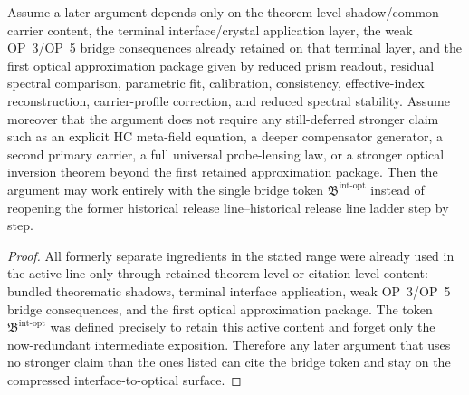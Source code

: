 \begin{proposition}
\label{prop:first-bundled-theorem-level-shadow-package}
\label{prop:first-v320-crystal-shadow-compatibility-principle}
\label{prop:terminal-citation-rule-for-the-present-v320-working-interface}
\label{prop:first-interface-level-defect-face-vanishing-principle}
\label{prop:first-interface-level-fluid-readout-demotion-principle}
\label{prop:first-interface-level-common-carrier-projection-principle}
\label{prop:first-interface-level-probe-coupling-principle}
\label{prop:first-bundled-interface-application-package}
\label{prop:first-op3-op5-bridge-test-on-the-terminal-interface}
\label{prop:first-parametric-spectral-fit-principle}
\label{prop:first-three-parameter-spectral-calibration-principle}
\label{prop:first-overdetermined-spectral-consistency-principle}
\label{prop:first-effective-index-reconstruction-principle-from-prism-data}
\label{prop:first-carrier-profile-correction-principle}
\label{prop:first-reduced-spectral-stability-principle}
\label{prop:first-bundled-optical-approximation-package}
Assume a later argument depends only on the theorem-level shadow/common-carrier content, the terminal interface/crystal application layer, the weak OP~3/OP~5 bridge consequences already retained on that terminal layer, and the first optical approximation package given by reduced prism readout, residual spectral comparison, parametric fit, calibration, consistency, effective-index reconstruction, carrier-profile correction, and reduced spectral stability. Assume moreover that the argument does not require any still-deferred stronger claim such as an explicit HC meta-field equation, a deeper compensator generator, a second primary carrier, a full universal probe-lensing law, or a stronger optical inversion theorem beyond the first retained approximation package. Then the argument may work entirely with the single bridge token $\mathfrak B^{\mathrm{int\text{-}opt}}$ instead of reopening the former historical release line--historical release line ladder step by step.
\end{proposition}

\begin{proof}
All formerly separate ingredients in the stated range were already used in the active line only through retained theorem-level or citation-level content: bundled theorematic shadows, terminal interface application, weak OP~3/OP~5 bridge consequences, and the first optical approximation package. The token $\mathfrak B^{\mathrm{int\text{-}opt}}$ was defined precisely to retain this active content and forget only the now-redundant intermediate exposition. Therefore any later argument that uses no stronger claim than the ones listed can cite the bridge token and stay on the compressed interface-to-optical surface.
\end{proof}

